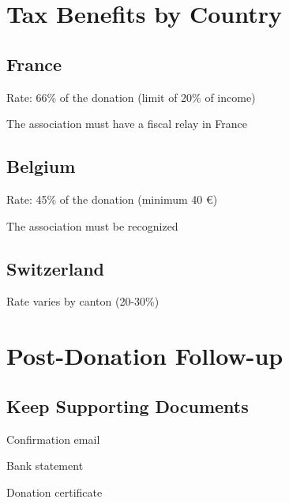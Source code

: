 \documentclass[12pt, a4paper]{article}
\begin{document}
\newpage

\section{Tax Benefits by Country}

\subsection{France}
\begin{heartlist}
    \item Rate: 66\% of the donation (limit of 20\% of income)
    \item The association must have a fiscal relay in France
\end{heartlist}

\subsection{Belgium}
\begin{heartlist}
    \item Rate: 45\% of the donation (minimum 40 €)
    \item The association must be recognized
\end{heartlist}

\subsection{Switzerland}
\begin{heartlist}
    \item Rate varies by canton (20-30\%)
\end{heartlist}

\newpage

\section{Post-Donation Follow-up}

\subsection{Keep Supporting Documents}
\begin{checklist}
    \item Confirmation email
    \item Bank statement
    \item Donation certificate
\end{checklist}
\end{document}
